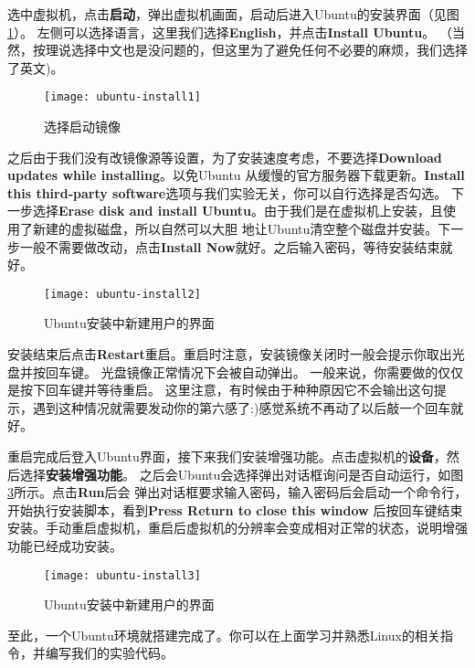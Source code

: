 选中虚拟机，点击\textbf{启动}，弹出虚拟机画面，启动后进入Ubuntu的安装界面（见图\ref{fig:ubuntu-install1}）。
左侧可以选择语言，这里我们选择\textbf{English}，并点击\textbf{Install Ubuntu}。
（当然，按理说选择中文也是没问题的，但这里为了避免任何不必要的麻烦，我们选择了英文)。

\begin{figure}[htbp]
  \centering
  \texttt{[image: ubuntu-install1]}
  \caption{选择启动镜像}\label{fig:ubuntu-install1}
\end{figure}

之后由于我们没有改镜像源等设置，为了安装速度考虑，不要选择\textbf{Download updates while installing}。以免Ubuntu
从缓慢的官方服务器下载更新。\textbf{Install this third-party software}选项与我们实验无关，你可以自行选择是否勾选。
下一步选择\textbf{Erase disk and install Ubuntu}。由于我们是在虚拟机上安装，且使用了新建的虚拟磁盘，所以自然可以大胆
地让Ubuntu清空整个磁盘并安装。下一步一般不需要做改动，点击\textbf{Install Now}就好。之后输入密码，等待安装结束就好。

\begin{figure}[htbp]
  \centering
  \texttt{[image: ubuntu-install2]}
  \caption{Ubuntu安装中新建用户的界面}\label{fig:ubuntu-install2} 
\end{figure}

安装结束后点击\textbf{Restart}重启。重启时注意，安装镜像关闭时一般会提示你取出光盘并按回车键。
光盘镜像正常情况下会被自动弹出。
一般来说，你需要做的仅仅是按下回车键并等待重启。
这里注意，有时候由于种种原因它不会输出这句提示，遇到这种情况就需要发动你的第六感了:)感觉系统不再动了以后敲一个回车就好。

重启完成后登入Ubuntu界面，接下来我们安装增强功能。点击虚拟机的\textbf{设备}，然后选择\textbf{安装增强功能}。
之后会Ubuntu会选择弹出对话框询问是否自动运行，如图\ref{fig:ubuntu-install3}所示。点击\textbf{Run}后会
弹出对话框要求输入密码，输入密码后会启动一个命令行，开始执行安装脚本，看到\textbf{Press Return to close this window}
后按回车键结束安装。手动重启虚拟机，重启后虚拟机的分辨率会变成相对正常的状态，说明增强功能已经成功安装。

\begin{figure}[htbp]
  \centering
  \texttt{[image: ubuntu-install3]}
  \caption{Ubuntu安装中新建用户的界面}\label{fig:ubuntu-install3} 
\end{figure}

至此，一个Ubuntu环境就搭建完成了。你可以在上面学习并熟悉Linux的相关指令，并编写我们的实验代码。

